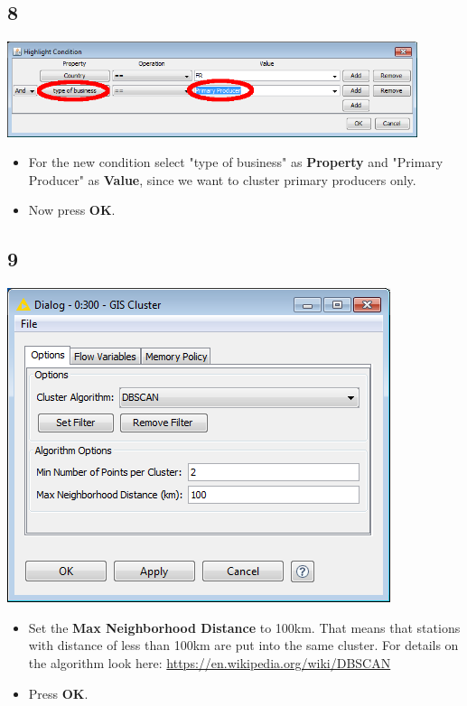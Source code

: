 \documentclass{beamer}
\begin{document}
\subsection{8}
\begin{frame}
	\begin{center}
  		\includegraphics[width=0.9\textwidth]{8.png}
	\end{center}
	\begin{itemize}
		\item For the new condition select "type of business" as \textbf{Property} and "Primary Producer" as \textbf{Value}, since we want to cluster primary producers only.
		\item Now press \textbf{OK}.
	\end{itemize}
\end{frame}

\subsection{9}
\begin{frame}
	\begin{center}
  		\includegraphics[height=0.6\textheight]{9.png}
	\end{center}
	\begin{itemize}
		\item Set the \textbf{Max Neighborhood Distance} to 100km. That means that stations with distance of less than 100km are put into the same cluster. For details on the algorithm look here: \url{https://en.wikipedia.org/wiki/DBSCAN}
		\item Press \textbf{OK}.
	\end{itemize}
\end{frame}
\end{document}
